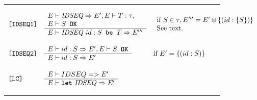 \documentclass[12pt]{article} %
\newcommand{\reserved}[1]{\textbf{\texttt{#1}}} %
\newcommand{\RULELAB}[1]{\texttt{#1}}
\newcommand{\UNSPACEFORBOX}{\vspace{-2ex}}
\newcommand{\HLINE}{\UNSPACEFORBOX%
\begin{flushleft}\rule{\textwidth}{0.01in}\end{flushleft}%
\UNSPACEFORBOX}
\newenvironment{BFIGURE}{

\begin{figure}
\small
\HLINE
}{
\HLINE
\normalsize
\end{figure}
}
\newcommand{\nonterm}[1]{\mbox{\it #1}}
\begin{document}
\begin{BFIGURE}
\begin{displaymath}
\begin{array}{lll}
\RULELAB{[IDSEQ1]} &
\begin{array}{l}
E \vdash \mbox{\nonterm{IDSEQ}} \Rightarrow E', E \vdash T:\tau, \\
E \vdash S \reserved{ OK} \\
\hline
E \vdash \mbox{\nonterm{IDSEQ }} id:S \reserved{ be } T \Rightarrow E'''
\end{array}
&
\begin{array}{l}
\mbox{if } S \in \tau, E''' = E' \uplus \{(id:\{S\})\} \\
\mbox {See text.}
\end{array}
\\
~\\
\RULELAB{[IDSEQ2]} &
\begin{array}{l}
E \vdash id:S \Rightarrow E', E \vdash S \reserved{ OK} \\
\hline
E \vdash id:S \Rightarrow E' \\
\end{array}
&
\mbox{if } E' = \{(id:S)\}
\\
~\\ 
\RULELAB{[LC]} &
\begin{array}{l}
E \vdash IDSEQ => E'\\
\hline
E \vdash \mbox{\reserved{let} \textit{IDSEQ}} \Rightarrow E'
\end{array}


\end{array}
\end{displaymath}
\end{BFIGURE}
\end{document}
